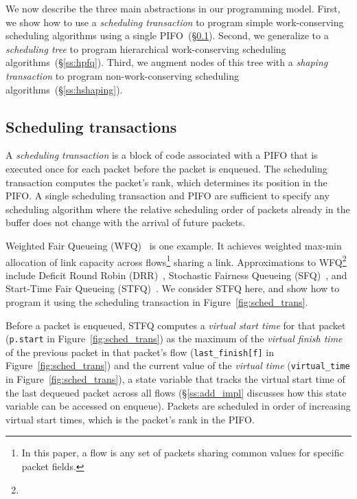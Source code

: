 We now describe the three main abstractions in our programming model. First, we
show how to use a {\em scheduling transaction} to program simple
work-conserving scheduling algorithms using a single PIFO~(\S\ref{ss:wfq}).
Second, we generalize to a {\em scheduling tree} to program hierarchical
work-conserving scheduling algorithms~(\S\ref{ss:hpfq}). Third, we augment
nodes of this tree with a {\em shaping transaction} to program
non-work-conserving scheduling algorithms~(\S\ref{ss:hshaping}).

\subsection{Scheduling transactions}
\label{ss:wfq}

A {\em scheduling transaction} is a block of code associated with a
PIFO that is executed once for each packet before the packet is
enqueued. The scheduling transaction computes the packet's rank, which
determines its position in the PIFO.  
A single scheduling transaction and PIFO are sufficient to specify any
scheduling algorithm where the relative scheduling order of packets
already in the buffer does not change with the arrival of future
packets.

Weighted Fair Queueing (WFQ)~\cite{wfq} is one example. It achieves weighted
max-min allocation of link capacity across flows\footnote{In this paper, a flow is any set of packets sharing
common values for specific packet fields.} sharing a link.  Approximations to
WFQ\footnote{} include Deficit
Round Robin (DRR)~\cite{drr}, Stochastic Fairness Queueing (SFQ)~\cite{sfq},
and Start-Time Fair Queueing (STFQ)~\cite{stfq}. We consider STFQ here, and
show how to program it using the scheduling transaction in
Figure~\ref{fig:sched_trans}.



Before a packet is enqueued, STFQ computes a {\em virtual start time}
for that packet (\texttt{p.start} in Figure~\ref{fig:sched_trans}) as
the maximum of the {\em virtual finish time} of the previous packet in
that packet's flow (\texttt{last\_finish[f]} in
Figure~\ref{fig:sched_trans}) and the current value of the {\em
  virtual time} (\texttt{virtual\_time} in Figure~\ref{fig:sched_trans}), a state variable that tracks the virtual
start time of the last dequeued packet across all flows
(\S\ref{ss:add_impl} discusses how this state variable can be accessed
on enqueue). Packets are scheduled in order of increasing virtual
start times, which is the packet's rank in the PIFO.

